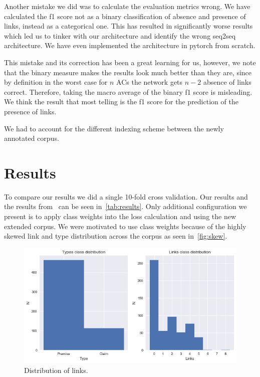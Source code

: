\documentclass[onecolumn]{article}
\begin{document}
Another mistake we did was to calculate the evaluation metrics wrong.
We have calculated the f1 score not as a binary classification of absence and presence of links, instead as a categorical one.
This has resulted in significantly worse results which led us to tinker with our architecture and identify the wrong seq2seq architecture. We have even implemented the architecture in pytorch from scratch.

This mistake and its correction has been a great learning for us, however, we note that the binary measure makes the results look much better than they are,
since by definition in the worst case for $n$ ACs the network gets $n-2$ absence of links correct. Therefore, taking the macro average of the binary f1 score is misleading. We think the result that most telling is the f1 score for the prediction of the presence of links.

We had to account for the different indexing scheme between the newly annotated corpus.

\section{Results}
To compare our results we did a single 10-fold cross validation. Our results and the results from~\cite{potash2017here} can be seen in~\autoref{tab:results}.
Only additional configuration we present is to apply class weights into the loss calculation and using the new extended corpus.
We were motivated to use class weights because of the highly skewed link and type distribution across the corpus as seen in~\autoref{fig:skew}.

\begin{figure}[h]
    \centering
    \includegraphics[width=0.4\linewidth]{fig/dist.png}
    \caption{Distribution of links.}\label{fig:skew}
\end{figure}
\end{document}

